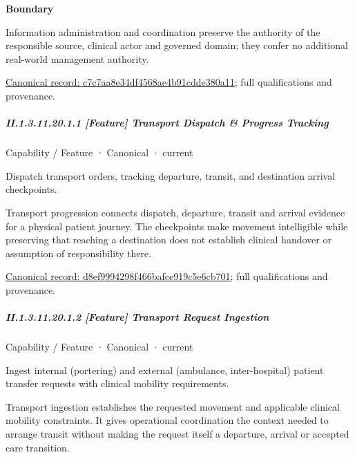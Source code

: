 \textbf{Boundary}



Information administration and coordination preserve the authority of the responsible source, clinical actor and governed domain; they confer no additional real-world management authority.


{\footnotesize \href{../../../../continuum/strategy/capability/c7c7aa8e34df4568ae4b91cdde380a11.md}{Canonical record: c7c7aa8e34df4568ae4b91cdde380a11}; full qualifications and provenance.}\par
\subparagraph*{II.1.3.11.20.1.1 [Feature] Transport Dispatch \& Progress Tracking}
\label{navigation:II.1.3.11.20.1.1}

\label{element:d8ef9994298f466bafce919c5e6cb701}
{\small Capability / Feature · Canonical · current}\par

Dispatch transport orders, tracking departure, transit, and destination arrival checkpoints.



Transport progression connects dispatch, departure, transit and arrival evidence for a physical patient journey. The checkpoints make movement intelligible while preserving that reaching a destination does not establish clinical handover or assumption of responsibility there.


{\footnotesize \href{../../../../continuum/strategy/capability/feature/d8ef9994298f466bafce919c5e6cb701.md}{Canonical record: d8ef9994298f466bafce919c5e6cb701}; full qualifications and provenance.}\par
\subparagraph*{II.1.3.11.20.1.2 [Feature] Transport Request Ingestion}
\label{navigation:II.1.3.11.20.1.2}

\label{element:7104472d065840eb91ae4cb7a3a0cb43}
{\small Capability / Feature · Canonical · current}\par

Ingest internal (portering) and external (ambulance, inter-hospital) patient transfer requests with clinical mobility requirements.



Transport ingestion establishes the requested movement and applicable clinical mobility constraints. It gives operational coordination the context needed to arrange transit without making the request itself a departure, arrival or accepted care transition.


